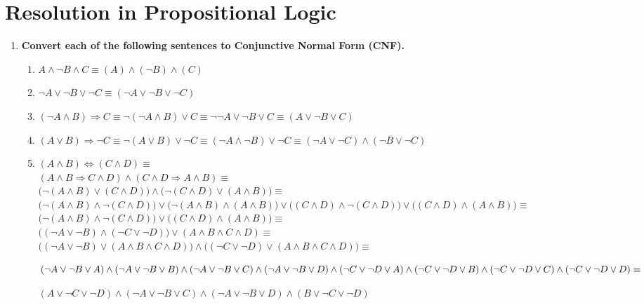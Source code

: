 \section{Resolution in Propositional Logic}

\begin{enumerate}

\item \textbf{Convert each of the following sentences to Conjunctive Normal Form (CNF).}

\begin{enumerate}

\item $A \land \neg B \land C \equiv (A) \land (\neg B) \land (C)$

\item $\neg A \lor \neg B \lor \neg C \equiv (\neg A \lor \neg B \lor \neg C)$

\item
$(\neg A \land B) \Rightarrow C \equiv
\neg (\neg A \land B) \lor C \equiv
\neg \neg A \lor \neg B \lor C \equiv
(A \lor \neg B \lor C)$

\item
$(A \lor B) \Rightarrow \neg C \equiv
\neg (A \lor B) \lor \neg C \equiv
(\neg A \land \neg B) \lor \neg C \equiv
(\neg A \lor \neg C) \land (\neg B \lor \neg C)$

\item
$(A \land B) \Leftrightarrow (C \land D) \equiv$\\
$(A \land B \Rightarrow C \land D) \land (C \land D \Rightarrow A \land B) \equiv$\\
$\big(\neg (A \land B) \lor (C \land D)\big) \land \big(\neg (C \land D) \lor (A \land B)\big) \equiv$\\
$\big(\neg (A \land B) \land \neg (C \land D)\big) \lor \big(\neg (A \land B) \land (A \land B)\big) \lor \big((C \land D) \land \neg (C \land D)\big) \lor \big((C \land D) \land (A \land B)\big) \equiv$\\
$\big(\neg (A \land B) \land \neg (C \land D)\big) \lor \big((C \land D) \land (A \land B)\big) \equiv$\\
$\big((\neg A \lor \neg B) \land (\neg C \lor \neg D)\big) \lor (A \land B \land C \land D) \equiv$\\
$\big((\neg A \lor \neg B) \lor (A \land B \land C \land D)\big) \land \big((\neg C \lor \neg D) \lor (A \land B \land C \land D)\big) \equiv $ 

$(\neg A \lor \neg B \lor A) \land (\neg A \lor \neg B \lor B) \land (\neg A \lor \neg B \lor C) \land (\neg A \lor \neg B \lor D) \land\\(\neg C \lor \neg D \lor A) \land (\neg C \lor \neg D \lor B) \land (\neg C \lor \neg D \lor C) \land (\neg C \lor \neg D \lor D) \equiv $ 

$(A \lor \neg C \lor \neg D) \land (\neg A \lor \neg B \lor C) \land (\neg A \lor \neg B \lor D) \land (B \lor \neg C \lor \neg D)$\\

\end{enumerate}

\end{enumerate}



